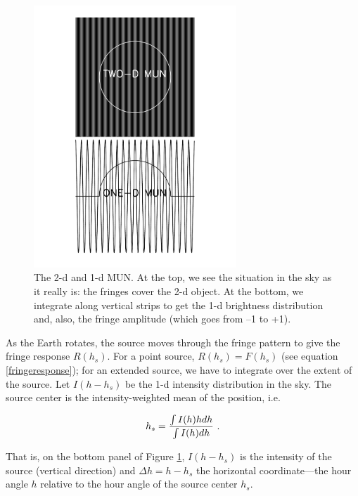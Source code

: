 \documentclass[11pt,preprint]{aastex}
\begin{document}
\begin{figure}[h!]
\begin{center}
\includegraphics[width=3.0in] {plots/interf_fig.pdf}
\end{center}
                                                                                
\caption{\footnotesize The 2-d and 1-d MUN. At the top, we see the
  situation in the sky as it really is: the fringes cover the 2-d
  object.  At the bottom, we integrate along vertical strips to get the
  1-d brightness distribution and, also, the fringe amplitude (which
  goes from --1 to +1).
\label{interf_fig} } \end{figure}

As the Earth rotates, the source moves through the fringe pattern to
give the fringe response $R(h_s)$. For a point source, $R(h_s)= F(h_s)$
(see equation \ref{fringeresponse}); for an extended source, we have to
integrate over the extent of the source.  Let $I(h - h_s)$ be the 1-d
intensity distribution in the sky. 
The source center is the intensity-weighted mean of the
position, i.e.

\begin{equation}
h_s = { \int I(h)h dh \over \int I(h) dh} \ .
\end{equation}

\noindent That is, on the bottom panel of
Figure \ref{interf_fig}, $I(h - h_s)$ is the intensity of the source (vertical
direction) and $\Delta h= h -h_s$ the horizontal coordinate---the hour
angle $h$ relative to the hour angle of the source center $h_s$. 
\end{document}
